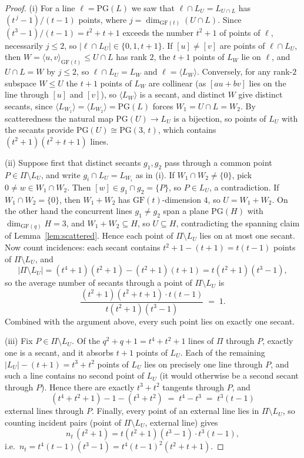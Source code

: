 \documentclass[12pt]{article}
\theoremstyle{definition}
\numberwithin{equation}{section}
\newcommand{\GF}[1]{\mathrm{GF}(#1)}
\newcommand{\PG}[2]{\mathrm{PG}(#1,\,#2)}
\newcommand{\PGv}[1]{\mathrm{PG}(#1)}
\begin{document}
\begin{proof}
(i)  For a line $\ell=\PGv{L}$ we saw that $\ell\cap L_U=L_{U\cap L}$ has $(t^{\,j}-1)/(t-1)$ points, where $j=\dim_{\GF{t}}(U\cap L)$.  Since $(t^{3}-1)/(t-1)=t^2+t+1$ exceeds the number $t^{2}+1$ of points of $\ell$, necessarily $j\leq2$, so $|\ell\cap L_U|\in\{0,1,t+1\}$.  If $[u]\neq[v]$ are points of $\ell\cap L_U$, then $W=\langle u,v\rangle_{\GF t}\leq U\cap L$ has rank $2$, the $t+1$ points of $L_W$ lie on $\ell$, and $U\cap L=W$ by $j\le2$, so $\ell\cap L_U=L_W$ and $\ell=\langle L_W\rangle$. Conversely, for any rank-$2$ subspace $W\leq U$ the $t+1$ points of $L_W$ are collinear (as $[au+bv]$ lies on the line through $[u]$ and $[v]$), so $\langle L_W\rangle$ is a secant, and distinct $W$ give distinct secants, since $\langle L_{W_1}\rangle=\langle L_{W_2}\rangle=\PGv{L}$ forces $W_1=U\cap L=W_2$.  By scatteredness the natural map $\PGv{U}\to L_U$ is a bijection, so points of $L_U$ with the secants provide $\PGv{U}\cong\PG3t$, which contains $(t^2+1)(t^2+t+1)$ lines.

(ii)  Suppose first that distinct secants $g_1,g_2$ pass through a common point $P\in\Pi\setminus L_U$, and write $g_i\cap L_U=L_{W_i}$ as in (i).  If $W_1\cap W_2\neq\{0\}$, pick  $0\ne w\in W_1\cap W_2$. Then $[w]\in g_1\cap g_2=\{P\}$, so $P\in L_U$, a contradiction.  If $W_1\cap W_2=\{0\}$, then $W_1+W_2$ has $\GF{t}$-dimension $4$, so $U=W_1+W_2$. On the other hand the concurrent lines $g_1\neq g_2$ span a plane $\PGv{H}$ with $\dim_{\GF q}H=3$, and $W_1+W_2\subseteq H$, so $U\subseteq H$, contradicting the spanning claim of Lemma~\ref{lem:scattered}.  Hence each point of $\Pi\setminus L_U$ lies on at most one secant.  Now count incidences: each secant contains $t^2+1-(t+1)=t(t-1)$ points of $\Pi\setminus L_U$, and
\[
  |\Pi\setminus L_U| =(t^4+1)(t^2+1)-(t^2+1)(t+1) =t(t^2+1)(t^3-1),
\]
so the average number of secants through a point of $\Pi\setminus L_U$ is
\[
  \frac{(t^2+1)(t^2+t+1)\cdot t(t-1)}{t(t^2+1)(t^3-1)}\;=\;1 .
\]
Combined with the argument above, every such point lies on exactly one secant.

(iii)  Fix $P\in\Pi\setminus L_U$.  Of the $q^2+q+1=t^4+t^2+1$ lines of $\Pi$ through $P$, exactly one is a secant, and it absorbs $t+1$ points of $L_U$.  Each of the remaining $|L_U|-(t+1)=t^3+t^2$ points of $L_U$ lies on precisely one line through $P$, and such a line contains no second point of $L_U$ (it would otherwise be a second secant through $P$). Hence there are exactly $t^3+t^2$ tangents through $P$, and
\[
  (t^4+t^2+1)-1-(t^3+t^2)\;=\;t^4-t^3\;=\;t^3(t-1)
\]
external lines through $P$.  Finally, every point of an external line lies in $\Pi\setminus L_U$, so counting incident pairs (point of $\Pi\setminus L_U$, external line) gives \[n_t\,(t^2+1)=t(t^2+1)(t^3-1)\cdot t^3(t-1),\] i.e.\ $n_t=t^4(t-1)(t^3-1)=t^4(t-1)^2(t^2+t+1)$.
\end{proof}
\end{document}
